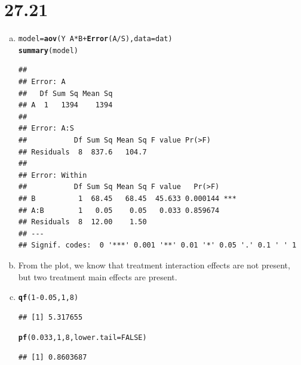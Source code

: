 \documentclass{article}\usepackage[]{graphicx}\usepackage[]{color}
\makeatletter
\newcommand{\hlnum}[1]{\textcolor[rgb]{0.686,0.059,0.569}{#1}}%
\newcommand{\hlopt}[1]{\textcolor[rgb]{0,0,0}{#1}}%
\newcommand{\hlstd}[1]{\textcolor[rgb]{0.345,0.345,0.345}{#1}}%
\newcommand{\hlkwb}[1]{\textcolor[rgb]{0.69,0.353,0.396}{#1}}%
\newcommand{\hlkwc}[1]{\textcolor[rgb]{0.333,0.667,0.333}{#1}}%
\newcommand{\hlkwd}[1]{\textcolor[rgb]{0.737,0.353,0.396}{\textbf{#1}}}%
\newenvironment{kframe}{%
 \def\at@end@of@kframe{}%
 \ifinner\ifhmode%
  \def\at@end@of@kframe{\end{minipage}}%
  \begin{minipage}{\columnwidth}%
 \fi\fi%
 \def\FrameCommand##1{\hskip\@totalleftmargin \hskip-\fboxsep
 \colorbox{shadecolor}{##1}\hskip-\fboxsep
     \hskip-\linewidth \hskip-\@totalleftmargin \hskip\columnwidth}%
 \MakeFramed {\advance\hsize-\width
   \@totalleftmargin\z@ \linewidth\hsize
   \@setminipage}}%
 {\par\unskip\endMakeFramed%
 \at@end@of@kframe}
\newenvironment{knitrout}{}{} %
\makeatother
\begin{document}
\section{27.21}

\begin{enumerate}[(a)]

\item

\begin{knitrout}
\color{fgcolor}\begin{kframe}
\begin{alltt}
  \hlstd{model} \hlkwb{=} \hlkwd{aov}\hlstd{(Y}\hlopt{~} \hlstd{A}\hlopt{*}\hlstd{B}\hlopt{+}\hlkwd{Error}\hlstd{(A}\hlopt{/}\hlstd{S),} \hlkwc{data} \hlstd{= dat)}
  \hlkwd{summary}\hlstd{(model)}
\end{alltt}
\begin{verbatim}
## 
## Error: A
##   Df Sum Sq Mean Sq
## A  1   1394    1394
## 
## Error: A:S
##           Df Sum Sq Mean Sq F value Pr(>F)
## Residuals  8  837.6   104.7               
## 
## Error: Within
##           Df Sum Sq Mean Sq F value   Pr(>F)    
## B          1  68.45   68.45  45.633 0.000144 ***
## A:B        1   0.05    0.05   0.033 0.859674    
## Residuals  8  12.00    1.50                     
## ---
## Signif. codes:  0 '***' 0.001 '**' 0.01 '*' 0.05 '.' 0.1 ' ' 1
\end{verbatim}
\end{kframe}
\end{knitrout}

\item



\qquad From the plot, we know that treatment interaction effects are not present, but two treatment main effects are present.

\item

\begin{knitrout}
\color{fgcolor}\begin{kframe}
\begin{alltt}
  \hlkwd{qf}\hlstd{(}\hlnum{1}\hlopt{-}\hlnum{0.05}\hlstd{,} \hlnum{1}\hlstd{,} \hlnum{8}\hlstd{)}
\end{alltt}
\begin{verbatim}
## [1] 5.317655
\end{verbatim}
\begin{alltt}
  \hlkwd{pf}\hlstd{(}\hlnum{0.033}\hlstd{,} \hlnum{1}\hlstd{,} \hlnum{8}\hlstd{,} \hlkwc{lower.tail} \hlstd{=} \hlnum{FALSE}\hlstd{)}
\end{alltt}
\begin{verbatim}
## [1] 0.8603687
\end{verbatim}
\end{kframe}
\end{knitrout}


\end{enumerate}
\end{document}
